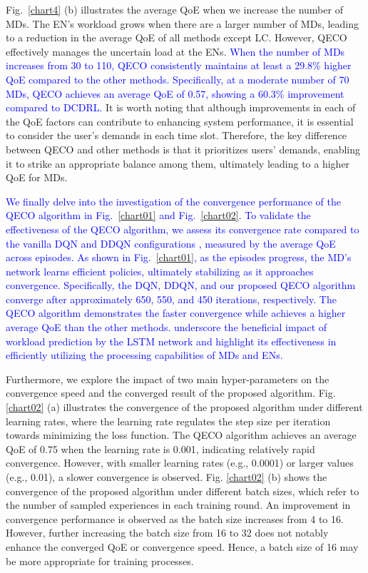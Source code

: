 \documentclass[12pt,draftclsnofoot,onecolumn]{IEEEtran}
\begin{document}
Fig.~\ref{chart4} (b) illustrates the average QoE when we increase the number of MDs. The EN's workload grows when there are a larger number of MDs, leading to a reduction in the average QoE of all methods except LC. However, QECO effectively manages the uncertain load at the ENs. \textcolor{blue}{When the number of MDs increases from 30 to 110, QECO consistently maintains at least a 29.8\% higher QoE compared to the other methods. Specifically, at a moderate number of 70 MDs, QECO achieves an average QoE of 0.57, showing a 60.3\% improvement compared to DCDRL.} It is worth noting that although improvements in each of the QoE factors can contribute to enhancing system performance, it is essential to consider the user's demands in each time slot. Therefore, the key difference between QECO and other methods is that it prioritizes users' demands, enabling it to strike an appropriate balance among them, ultimately leading to a higher QoE for MDs.



\textcolor{blue}{	
	We finally delve into the investigation of the convergence performance of the QECO algorithm in Fig.~\ref{chart01} and Fig.~\ref{chart02}. To validate the effectiveness of the QECO algorithm, we assess its convergence rate compared to the vanilla DQN and DDQN configurations \cite{van2016deep}, measured by the average QoE across episodes. As shown in Fig.~\ref{chart01}, as the episodes progress, the MD's network learns efficient policies, ultimately stabilizing as it approaches convergence. Specifically, the DQN, DDQN, and our proposed QECO algorithm converge after approximately 650, 550, and 450 iterations, respectively. 
	The QECO algorithm demonstrates the faster convergence while achieves a higher average QoE than the other methods. underscore the beneficial impact of workload prediction by the LSTM network and highlight its effectiveness in efficiently utilizing the processing capabilities of  MDs and ENs.
}

Furthermore, we explore the impact of two main hyper-parameters on the convergence speed and the converged result of the proposed algorithm. Fig. \ref{chart02} (a) illustrates the convergence of the proposed algorithm under different learning rates, where the learning rate regulates the step size per iteration towards minimizing the loss function. The QECO algorithm achieves an average QoE of 0.75 when the learning rate is 0.001, indicating relatively rapid convergence. However, with smaller learning rates (e.g., 0.0001) or larger values (e.g., 0.01),  a slower convergence is observed. Fig. \ref{chart02} (b) shows the convergence of the proposed algorithm under different batch sizes, which refer to the number of sampled experiences in each training round. An improvement in convergence performance is observed as the batch size increases from 4 to 16. However, further increasing the batch size from 16 to 32 does not notably enhance the converged QoE or convergence speed. Hence, a batch size of 16 may be more appropriate for training processes.
\end{document}
